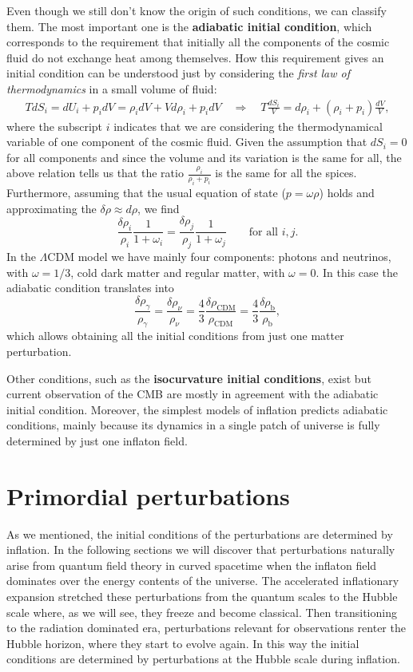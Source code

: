 Even though we still don't know the origin of such conditions, we can classify them. The most important one is the \textbf{adiabatic initial condition}, which corresponds to the requirement that initially all the components of the cosmic fluid do not exchange heat among themselves. How this requirement gives an initial condition can be understood just by considering the \emph{first law of thermodynamics} in a small volume of fluid:
\begin{align*}
    TdS_i=dU_i+p_idV=\rho_idV+Vd\rho_i+p_idV \quad\Rightarrow\quad T\frac{dS_i}{V}=d\rho_i+(\rho_i+p_i) \frac{dV}{V},
\end{align*}
where the subscript $i$ indicates that we are considering the thermodynamical variable of one component of the cosmic fluid. Given the assumption that $dS_i=0$ for all components and since the volume and its variation is the same for all, the above relation tells us that the ratio $\frac{\rho_i}{\rho_i+p_i}$ is the same for all the spices. Furthermore, assuming that the usual equation of state ($p=\omega\rho$) holds and approximating the $\delta\rho\approx d\rho$, we find
$$\frac{\delta \rho_i}{\rho_i}\frac{1}{1+\omega_i}=\frac{\delta \rho_j}{\rho_j}\frac{1}{1+\omega_j}\qquad\text{for all } i,j.$$
In the $\Lambda$CDM model we have mainly four components: photons and neutrinos, with $\omega=1/3$, cold dark matter and regular matter, with $\omega=0$. In this case the adiabatic condition translates into
\begin{equation}
    \frac{\delta \rho_\gamma}{\rho_\gamma}=\frac{\delta \rho_\nu}{\rho_\nu}=\frac{4}{3}\frac{\delta \rho_\text{CDM}}{\rho_\text{CDM}}=\frac{4}{3}\frac{\delta \rho_\text{b}}{\rho_\text{b}},
\end{equation}
which allows obtaining all the initial conditions from just one matter perturbation.

Other conditions, such as the \textbf{isocurvature initial conditions}, exist but current observation of the CMB are mostly in agreement with the adiabatic initial condition. Moreover, the simplest models of inflation predicts adiabatic conditions, mainly because its dynamics in a single patch of universe is fully determined by just one inflaton field.   

\section{Primordial perturbations}
As we mentioned, the initial conditions of the perturbations are determined by inflation. In the following sections we will discover that perturbations naturally arise from quantum field theory in curved spacetime when the inflaton field dominates over the energy contents of the universe. The accelerated inflationary expansion stretched these perturbations from the quantum scales to the Hubble scale where, as we will see, they freeze and become classical. Then transitioning to the radiation dominated era, perturbations relevant for observations renter the Hubble horizon, where they start to evolve again. In this way the initial conditions are determined by perturbations at the Hubble scale during inflation. 
